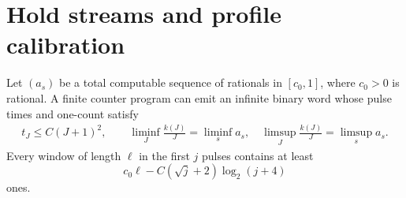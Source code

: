 \section{Hold streams and profile calibration}\label{sec:profile-stream}
\begin{lemma}\label{lem:profile-hold}
Let $(a_s)$ be a total computable sequence of rationals in $[c_0,1]$, where $c_0>0$ is rational. A finite counter program can emit an infinite binary word whose pulse times and one-count satisfy
\begin{gather*}
 t_J\le C(J+1)^2,\qquad
 \liminf_J\frac{k(J)}J=\liminf_sa_s,\quad
 \limsup_J\frac{k(J)}J=\limsup_sa_s.
\end{gather*}
Every window of length $\ell$ in the first $j$ pulses contains at least
\[
 c_0\ell-C(\sqrt j+2)\log_2(j+4)
\]
ones.
\end{lemma}
